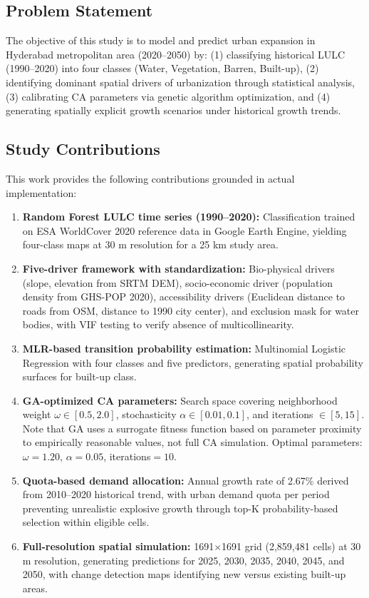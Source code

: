 \documentclass[conference]{IEEEtran}
\begin{document}
\subsection{Problem Statement}
The objective of this study is to model and predict urban expansion in Hyderabad metropolitan area (2020--2050) by: (1) classifying historical LULC (1990--2020) into four classes (Water, Vegetation, Barren, Built-up), (2) identifying dominant spatial drivers of urbanization through statistical analysis, (3) calibrating CA parameters via genetic algorithm optimization, and (4) generating spatially explicit growth scenarios under historical growth trends.

\subsection{Study Contributions}
This work provides the following contributions grounded in actual implementation:

\begin{enumerate}
\item \textbf{Random Forest LULC time series (1990--2020):} Classification trained on ESA WorldCover 2020 reference data in Google Earth Engine, yielding four-class maps at 30 m resolution for a 25 km study area.

\item \textbf{Five-driver framework with standardization:} Bio-physical drivers (slope, elevation from SRTM DEM), socio-economic driver (population density from GHS-POP 2020), accessibility drivers (Euclidean distance to roads from OSM, distance to 1990 city center), and exclusion mask for water bodies, with VIF testing to verify absence of multicollinearity.

\item \textbf{MLR-based transition probability estimation:} Multinomial Logistic Regression with four classes and five predictors, generating spatial probability surfaces for built-up class.

\item \textbf{GA-optimized CA parameters:} Search space covering neighborhood weight $\omega \in [0.5, 2.0]$, stochasticity $\alpha \in [0.01, 0.1]$, and iterations $\in [5, 15]$. Note that GA uses a surrogate fitness function based on parameter proximity to empirically reasonable values, not full CA simulation. Optimal parameters: $\omega=1.20$, $\alpha=0.05$, iterations$=10$.

\item \textbf{Quota-based demand allocation:} Annual growth rate of 2.67\% derived from 2010--2020 historical trend, with urban demand quota per period preventing unrealistic explosive growth through top-K probability-based selection within eligible cells.

\item \textbf{Full-resolution spatial simulation:} 1691$\times$1691 grid (2,859,481 cells) at 30 m resolution, generating predictions for 2025, 2030, 2035, 2040, 2045, and 2050, with change detection maps identifying new versus existing built-up areas.
\end{enumerate}
\end{document}
